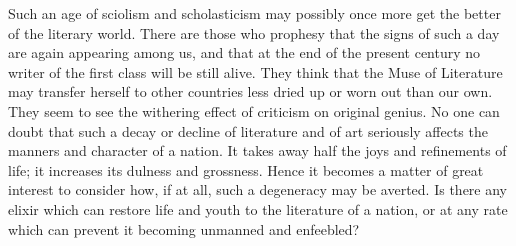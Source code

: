\documentclass[11pt,letter]{article}
\begin{document}
\par  Such an age of sciolism and scholasticism may possibly once more get the better of the literary world. There are those who prophesy that the signs of such a day are again appearing among us, and that at the end of the present century no writer of the first class will be still alive. They think that the Muse of Literature may transfer herself to other countries less dried up or worn out than our own. They seem to see the withering effect of criticism on original genius. No one can doubt that such a decay or decline of literature and of art seriously affects the manners and character of a nation. It takes away half the joys and refinements of life; it increases its dulness and grossness. Hence it becomes a matter of great interest to consider how, if at all, such a degeneracy may be averted. Is there any elixir which can restore life and youth to the literature of a nation, or at any rate which can prevent it becoming unmanned and enfeebled?
\end{document}
